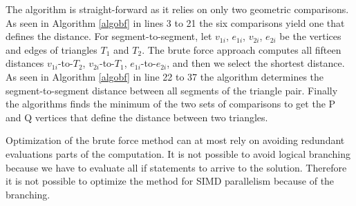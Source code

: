 \documentclass[times,12pt]{article}
\begin{document}
The algorithm is straight-forward as it relies on only two geometric comparisons. As seen in Algorithm \ref{algobf} in lines 3 to 21 the six comparisons yield one that defines the distance. For segment-to-segment, let $v_{1i}$, $e_{1i}$, $v_{2i}$, $e_{2i}$ be the vertices and edges of triangles $T_1$ and $T_2$. The brute force approach computes all fifteen distances $v_{1i}$-to-$T_2$, $v_{2i}$-to-$T_1$, $e_{1i}$-to-$e_{2i}$, and then we select the shortest distance. As seen in Algorithm \ref{algobf} in line 22 to 37 the algorithm determines the segment-to-segment distance between all segments of the triangle pair. Finally the algorithms finds the minimum of the two sets of comparisons to get the P and Q vertices that define the distance between two triangles. 

Optimization of the brute force method can at most rely on avoiding redundant evaluations parts of the computation. It is not possible to avoid logical branching because we have to evaluate all if statements to arrive to the solution. Therefore it is not possible to optimize the method for SIMD parallelism because of the branching. 
\end{document}
